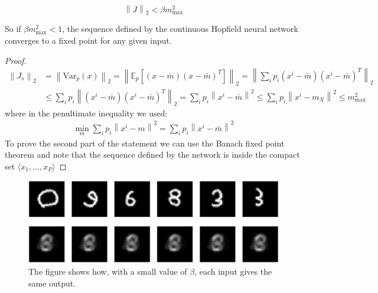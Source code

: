 \begin{proposition}\\
\label{prop:J_norm}
    $$\left\|J\right\|_2< \beta m^2_{\max} $$

    \noindent So if $\beta m^2_{\max} < 1 $, the sequence defined by the continuous Hopfield neural network converges to a fixed point for any given input.
    \begin{proof}
        \begin{align*}
            \left\|J_s\right\|_2 &= \left\|\text{Var}_p\left(x\right)\right\|_2 = \left\|\mathbb{E}_p\left[(x - \bar{m})(x - \bar{m})^T\right]\right\|_2 = \left\|\sum_i p_i (x^i - \bar{m})(x^i - \bar{m})^T\right\|_2\\
            &\leq \sum_i p_i \left\|(x^i - \bar{m})(x^i - \bar{m})^T\right\|_2 = \sum_i p_i \left\|x^i - \bar{m}\right\|^2 \leq \sum_i p_i \left\|x^i - m_X\right\|^2 \leq m^2_{\max}
        \end{align*}
        where in the penultimate inequality we used:
        \begin{align*}
            \min_m \sum_i p_i \left\|x^i - m\right\|^2 = \sum_i p_i \left\|x^i - \bar{m}\right\|^2
        \end{align*}
        To prove the second part of the statement we can use the Banach fixed point theorem and note that the sequence defined by the network is inside the compact set  $\langle{x_1,\ldots,x_P}\rangle$
    \end{proof}
\end{proposition}

\begin{figure}[hb]
    \centering
    \includegraphics[width=0.7\linewidth]{Figures/FCHopfield1.png}
    \caption{The figure shows how, with a small value of $\beta$, each input gives the same output.}
\end{figure}

